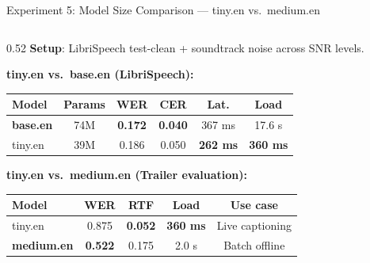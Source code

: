 \documentclass[aspectratio=169]{beamer}
\begin{document}
\begin{frame}{Experiment 5: Model Size Comparison — tiny.en vs.\ medium.en}
  \begin{columns}[T]
    \begin{column}{0.52\textwidth}
      \textbf{Setup}: LibriSpeech test-clean + soundtrack noise across SNR levels.

      \vspace{0.3cm}
      \textbf{tiny.en vs.\ base.en (LibriSpeech):}
      \begin{center}
        \small
        \begin{tabular}{@{}lccccc@{}}
          \toprule
          Model & Params & WER & CER & Lat. & Load \\
          \midrule
          \textbf{base.en} & 74M & \textbf{0.172} & \textbf{0.040} & 367 ms & 17.6 s \\
          tiny.en & 39M & 0.186 & 0.050 & \textbf{262 ms} & \textbf{360 ms} \\
          \bottomrule
        \end{tabular}
      \end{center}

      \vspace{0.3cm}
      \textbf{tiny.en vs.\ medium.en (Trailer evaluation):}
      \begin{center}
        \small
        \begin{tabular}{@{}lcccc@{}}
          \toprule
          Model & WER & RTF & Load & Use case \\
          \midrule
          tiny.en & 0.875 & \textbf{0.052} & \textbf{360 ms} & Live captioning \\
          \rowcolor{lightgray}
          \textbf{medium.en} & \textbf{0.522} & 0.175 & 2.0 s & Batch offline \\
          \bottomrule
        \end{tabular}
      \end{center}


\end{column}
\end{columns}
\end{frame}
\end{document}
